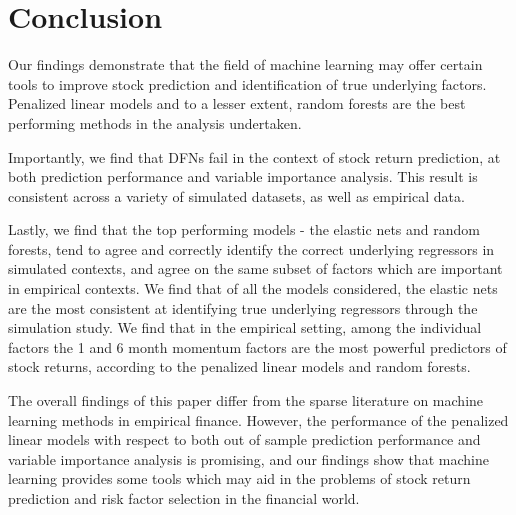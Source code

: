 \documentclass{article}
\begin{document}

\section{Conclusion}

Our findings demonstrate that the field of machine learning may offer certain tools to improve stock prediction and identification of true underlying factors. Penalized linear models and to a lesser extent, random forests are the best performing methods in the analysis undertaken.

Importantly, we find that DFNs fail in the context of stock return prediction, at both prediction performance and variable importance analysis. This result is consistent across a variety of simulated datasets, as well as empirical data. 

Lastly, we find that the top performing models - the elastic nets and random forests, tend to agree and correctly identify the correct underlying regressors in simulated contexts, and agree on the same subset of factors which are important in empirical contexts. We find that of all the models considered, the elastic nets are the most consistent at identifying true underlying regressors through the simulation study. We find that in the empirical setting, among the individual factors the 1 and 6 month momentum factors are the most powerful predictors of stock returns, according to the penalized linear models and random forests. 

The overall findings of this paper differ from the sparse literature on machine learning methods in empirical finance. However, the performance of the penalized linear models with respect to both out of sample prediction performance and variable importance analysis is promising, and our findings show that machine learning provides some tools which may aid in the problems of stock return prediction and risk factor selection in the financial world. 


\end{document}
